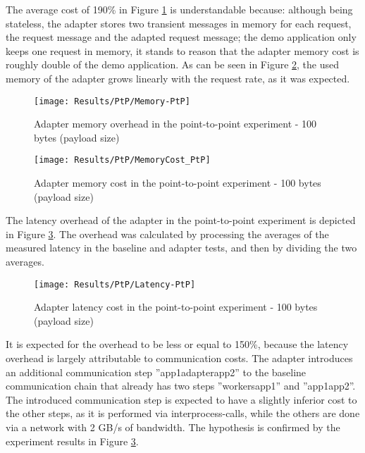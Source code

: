The average cost of 190\% in Figure \ref{fig:memPtp} is understandable because: although being stateless, the adapter stores two transient messages in memory for each request, the request message and the adapted request message;
the demo application only keeps one request in memory, it stands to reason that the adapter memory cost is roughly double of the demo application.
As can be seen in Figure \ref{fig:memCostPtp}, the used memory of the adapter grows linearly with the request rate, as it was expected.

\begin{figure}[htbp]
    \centering
    \centerline{\texttt{[image: Results/PtP/Memory-PtP]}}
    \caption{Adapter memory overhead in the point-to-point experiment - 100 bytes (payload size)}
    \label{fig:memPtp}
\end{figure}

\begin{figure}[htbp]
    \centering
    \centerline{\texttt{[image: Results/PtP/MemoryCost\_PtP]}}
    \caption{Adapter memory cost in the point-to-point experiment - 100 bytes (payload size)}
    \label{fig:memCostPtp}
\end{figure}

\newpage

The latency overhead of the adapter in the point-to-point experiment is depicted in Figure \ref{fig:latPtP}.
The overhead was calculated by processing the averages of the measured latency in the baseline and adapter tests, and then by dividing the two averages.

\begin{figure}[htbp]
    \centering
    \centerline{\texttt{[image: Results/PtP/Latency-PtP]}}
    \caption{Adapter latency cost in the point-to-point experiment - 100 bytes (payload size)}
    \label{fig:latPtP}
\end{figure}

It is expected for the overhead to be less or equal to 150\%, because the latency overhead is largely attributable to communication costs.
The adapter introduces an additional communication step ''app1\textrightarrow adapter\textrightarrow app2'' to the baseline communication chain that already has two steps ''workers\textrightarrow app1'' and ''app1\textrightarrow app2''.
The introduced communication step is expected to have a slightly inferior cost to the other steps, as it is performed via interprocess-calls, while the others are done via a network with 2 GB/s of bandwidth.
The hypothesis is confirmed by the experiment results in Figure \ref{fig:latPtP}.

